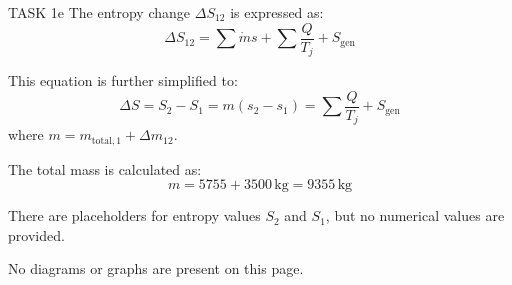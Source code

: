 TASK 1e  
The entropy change \( \Delta S_{12} \) is expressed as:  
\[
\Delta S_{12} = \sum \dot{m} s + \sum \frac{Q}{T_j} + S_{\text{gen}}
\]  

This equation is further simplified to:  
\[
\Delta S = S_2 - S_1 = m (s_2 - s_1) = \sum \frac{Q}{T_j} + S_{\text{gen}}
\]  
where \( m = m_{\text{total},1} + \Delta m_{12} \).  

The total mass is calculated as:  
\[
m = 5755 + 3500 \, \text{kg} = 9355 \, \text{kg}
\]  

There are placeholders for entropy values \( S_2 \) and \( S_1 \), but no numerical values are provided.  

No diagrams or graphs are present on this page.
